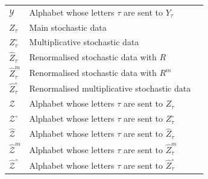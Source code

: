 \documentclass[11pt]{preprint}
\begin{document}
\begin{appendix}
\begin{center}
\begin{longtable}{lll}
		 \\ $\mathcal{Y}$ & Alphabet whose letters $ \tau$ are sent to $ Y_{\tau} $  & \pageref{eqdef_Ztau1}
		 \\ $ Z_{\tau} $ & Main stochastic data  & \pageref{eq_defZtau_Naif}
		 \\  $Z_{\tau}^\circ$ & Multiplicative stochastic data  & 
		 \pageref{eq_defZotau}
		 \\ $ \widehat{Z}_{\tau} $  & Renormalised stochastic data with  $R$ & \pageref{eq_Renorm_ZtauFromZotau}
		 \\  $ \widehat{Z}_{\tau}^m $  & Renormalised stochastic data with  $R^m$ & \pageref{BPHZ_model}
		 \\ $ \widehat{Z}_{\tau}^{\circ} $  & Renormalised multiplicative stochastic data & \pageref{eq_Renorm_ZtauFromZotau}
		 \\ $\mathcal{Z}$  & Alphabet whose letters $ \tau$ are sent to $ Z_{\tau} $  & \pageref{eq_defZtau_T+}
		  \\ $\mathcal{Z}^{\circ}$  & Alphabet whose letters $ \tau$ are sent to $ Z^{\circ}_{\tau} $  & \pageref{eq_defZotau}
		 \\   $\widehat{\mathcal{Z}}$  & Alphabet whose letters $ \tau$ are sent to $ \widehat{Z}_{\tau} $   & \pageref{eq_Renorm_ZtauFromZotau}
		 \\   $ \widehat{\mathcal{Z}}^m $  & Alphabet whose letters $ \tau$ are sent to $ \widehat{Z}_{\tau}^m $ & \pageref{BPHZ_model}
		 \\ $\widehat{\mathcal{Z}}^{\circ}$  & Alphabet whose letters $ \tau$ are sent to $ \widehat{Z}^{\circ}_{\tau} $  & \pageref{eq_Renorm_ZtauFromZotau}
		\end{longtable}
	\end{center}
	
	
	\end{appendix}
	
\end{document}
